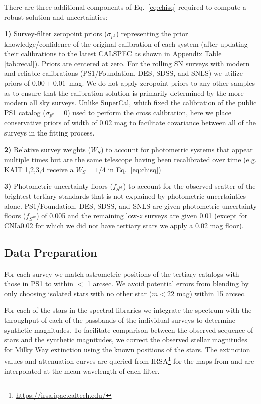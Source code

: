 \documentclass[twocolumn]{aastex63}
\newcommand{\blue}{\color{black}}
\begin{document}
{\blue There are three additional components of Eq.~\ref{eq:chisq} required to compute a robust solution and uncertainties: 

\textbf{1)} Survey-filter zeropoint priors ($\sigma_{p^k}$) representing the prior knowledge/confidence of the original calibration of each system (after updating their calibrations to the latest CALSPEC as shown in Appendix Table \ref{tab:recal}). Priors are centered at zero. For the rolling SN surveys with modern and reliable calibrations (PS1/Foundation, DES, SDSS, and SNLS) we utilize priors of $0.00\pm0.01$~mag. {\blue We do not apply zeropoint priors to any other samples as to ensure that the calibration solution is primarily determined by the more modern all sky surveys.} Unlike SuperCal, which fixed the calibration of the public PS1 catalog ($\sigma_{p^k}=0$) used to perform the cross calibration, here we place conservative priors of width of 0.02  mag to facilitate covariance between all of the surveys in the fitting process. 


\textbf{2)} Relative survey weights ($W_S$) to account for photometric systems that appear multiple times but are the same telescope having been recalibrated over time (e.g. KAIT 1,2,3,4 receive a $W_S=1/4$ in Eq.~\ref{eq:chisq})

\textbf{3)} Photometric uncertainty floors ($f_{S^{bk}}$) to account for the observed scatter of the brightest tertiary standards that is not explained by photometric uncertainties alone. PS1/Foundation, DES, SDSS, and SNLS are given photometric uncertainty floors ($f_{S^{bk}}$) of 0.005 and the remaining low-$z$ surveys are given 0.01 (except for CNIa0.02 for which we did not have tertiary stars we apply a 0.02 mag floor).
 }

\subsection{Data Preparation}
For each survey we match astrometric positions of the tertiary catalogs with those in PS1 to within $<$ 1 arcsec. We avoid potential errors from blending by only choosing isolated stars with no other star ($m < 22$ mag) within 15 arcsec.


For each of the stars in the spectral libraries we integrate the spectrum with the throughput of each of the passbands of the individual surveys to determine synthetic magnitudes. To facilitate comparison between the observed sequence of stars and the synthetic magnitudes, we correct the observed stellar magnitudes for Milky Way extinction using the known positions of the stars. The extinction values and attenuation curves are queried from IRSA\footnote{\href{https://irsa.ipac.caltech.edu/}{https://irsa.ipac.caltech.edu/}} for the maps from \cite{Schlafly11} and are interpolated at the mean wavelength of each filter.
\end{document}

